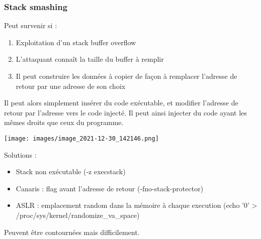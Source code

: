 \documentclass[a4paper]{article}
\begin{document}
\subsubsection{Stack smashing}
Peut survenir si :
\begin{enumerate}
    \item Exploitation d'un stack buffer overflow
    \item L'attaquant connaît la taille du buffer à remplir
    \item Il peut construire les données à copier de façon à remplacer l'adresse de retour par une adresse de son choix
\end{enumerate}
Il peut alors simplement insérer du code exécutable, et modifier l'adresse de retour par l'adresse vers le code injecté. Il peut ainsi injecter du code ayant les mêmes droits que ceux du programme.
\begin{center}
    \texttt{[image: images/image\_2021-12-30\_142146.png]}
\end{center}
Solutions :
\begin{itemize}[label = \textbullet, font = \Large]
    \item Stack non exécutable (-z execstack)
    \item Canaris : flag avant l'adresse de retour (-fno-stack-protector)
    \item ASLR : emplacement random dans la mémoire à chaque execution (echo '0' > /proc/sys/kernel/randomize\_va\_space)
\end{itemize}
Peuvent être contournées mais difficilement.
\end{document}
